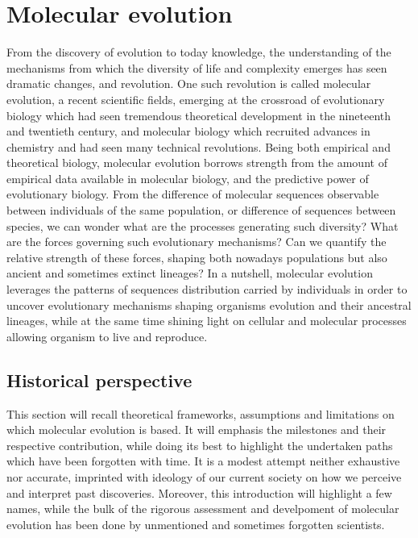 \thispagestyle{empty}
\chapter{Molecular evolution}
\minitoc
\label{sec:intro}

From the discovery of evolution to today knowledge, the understanding of the mechanisms from which the diversity of life and complexity emerges has seen dramatic changes, and revolution.
One such revolution is called molecular evolution, a recent scientific fields, emerging at the crossroad of evolutionary biology which had seen tremendous theoretical development in the nineteenth and twentieth century, and molecular biology which recruited advances in chemistry and had seen many technical revolutions.
Being both empirical and theoretical biology, molecular evolution borrows strength from the amount of empirical data available in molecular biology, and the predictive power of evolutionary biology.
From the difference of molecular sequences observable between individuals of the same population, or difference of sequences between species, we can wonder what are the processes generating such diversity?
What are the forces governing such evolutionary mechanisms?
Can we quantify the relative strength of these forces, shaping both nowadays populations but also ancient and sometimes extinct lineages?
In a nutshell, molecular evolution leverages the patterns of sequences distribution carried by individuals in order to uncover evolutionary mechanisms shaping organisms evolution and their ancestral lineages, while at the same time shining light on cellular and molecular processes allowing organism to live and reproduce.

\section{Historical perspective}

This section will recall theoretical frameworks, assumptions and limitations on which molecular evolution is based.
It will emphasis the milestones and their respective contribution, while doing its best to highlight the undertaken paths which have been forgotten with time.
It is a modest attempt neither exhaustive nor accurate, imprinted with ideology of our current society on how we perceive and interpret past discoveries.
Moreover, this introduction will highlight a few names, while the bulk of the rigorous assessment and develpoment of molecular evolution has been done by unmentioned and sometimes forgotten scientists.

